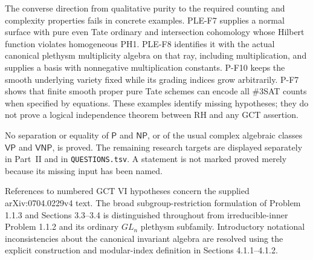 \documentclass[11pt,a4paper]{article}
\begin{document}
The converse direction from qualitative purity to the required counting
and complexity properties fails in concrete examples. PLE-F7 supplies a
normal surface with pure even Tate ordinary and intersection cohomology
whose Hilbert function violates homogeneous PH1. PLE-F8 identifies it
with the actual canonical plethysm multiplicity algebra on that ray,
including multiplication, and supplies a basis with nonnegative
multiplication constants. P-F10 keeps the smooth
underlying variety fixed while its grading indices grow arbitrarily.
P-F7 shows that finite smooth proper pure Tate schemes can encode all
\#3SAT counts when specified by equations. These examples identify
missing hypotheses; they do not prove a logical independence theorem
between RH and any GCT assertion.

No separation or equality of $\mathsf P$ and $\mathsf{NP}$, or of the
usual complex algebraic classes $\mathsf{VP}$ and $\mathsf{VNP}$, is
proved. The remaining research targets are displayed separately in
Part~II and in \texttt{QUESTIONS.tsv}. A statement is not marked proved
merely because its missing input has been named.

References to numbered GCT VI hypotheses concern the supplied
arXiv:0704.0229v4 text. The broad subgroup-restriction formulation
of Problem 1.1.3 and Sections 3.3--3.4 is distinguished throughout
from irreducible-inner Problem 1.1.2 and its ordinary $GL_n$
plethysm subfamily. Introductory notational inconsistencies about
the canonical invariant algebra are resolved using the explicit
construction and modular-index definition in Sections 4.1.1--4.1.2.
\end{document}
